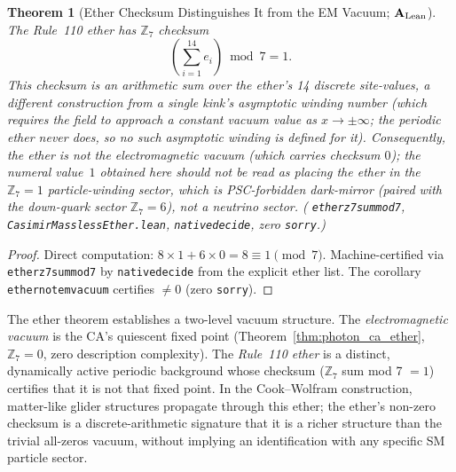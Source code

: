\documentclass[11pt]{article}
\newtheorem{theorem}{Theorem}[section]
\theoremstyle{remark}
\newcommand{\lean}[1]{%
  \penalty-100
  \begingroup\def\_{\textunderscore\allowbreak}\texttt{#1}\endgroup}
\newcommand{\CatAL}{\ensuremath{\textbf{A}_{\rm Lean}}}
\begin{document}
\begin{theorem}[Ether Checksum Distinguishes It from the EM Vacuum; $\CatAL$]
\label{thm:ether_winding}
The Rule~110 ether has $\mathbb{Z}_7$ checksum
\begin{equation}
  \left(\sum_{i=1}^{14} e_i\right) \bmod 7 = 1.
  \label{eq:ether_sum}
\end{equation}
This checksum is an arithmetic sum over the ether's 14 discrete site-values, a
different construction from a single kink's \emph{asymptotic} winding number
(which requires the field to approach a constant vacuum value as
$x\to\pm\infty$; the periodic ether never does, so no such asymptotic winding
is defined for it). Consequently, the ether is \emph{not} the electromagnetic
vacuum (which carries checksum $0$); the numeral value~$1$ obtained here
should \emph{not} be read as placing the ether in the $\mathbb{Z}_7=1$
particle-winding sector, which is PSC-forbidden dark-mirror (paired with the
down-quark sector $\mathbb{Z}_7=6$), not a neutrino sector.
(\lean{ether\_z7\_sum\_mod7}, \texttt{CasimirMasslessEther.lean},
\lean{native\_decide}, zero \texttt{sorry}.)
\end{theorem}

\begin{proof}
Direct computation: $8 \times 1 + 6 \times 0 = 8 \equiv 1 \pmod{7}$.
Machine-certified via \lean{ether\_z7\_sum\_mod7} by \lean{native\_decide}
from the explicit ether list.
The corollary \lean{ether\_not\_em\_vacuum} certifies $\neq 0$
(zero \texttt{sorry}).
\end{proof}

The ether theorem establishes a two-level vacuum structure.
The \emph{electromagnetic vacuum} is the CA's quiescent fixed point
(Theorem~\ref{thm:photon_ca_ether}, $\mathbb{Z}_7 = 0$, zero description
complexity).
The \emph{Rule~110 ether} is a distinct, dynamically active periodic
background whose checksum ($\mathbb{Z}_7$ sum mod 7 $=1$) certifies that it
is not that fixed point.
In the Cook--Wolfram construction, matter-like glider structures propagate
through this ether; the ether's non-zero checksum is a discrete-arithmetic
signature that it is a richer structure than the trivial all-zeros vacuum,
without implying an identification with any specific SM particle sector.
\end{document}
